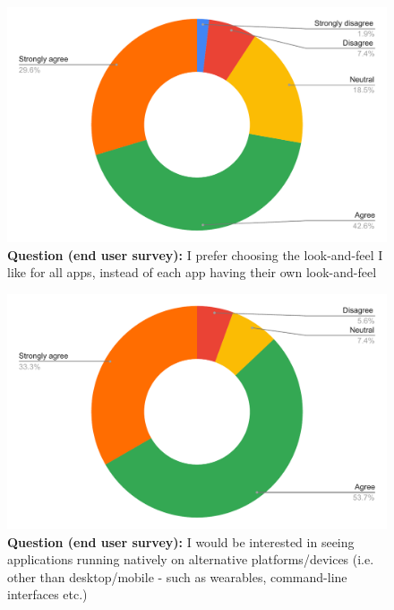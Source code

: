 \begin{figure}[H]
  \centering
  \includegraphics[width=13cm]{thesis/paper/images/p2u_q8.pdf}
  \textbf{Question (end user survey):} I prefer choosing the look-and-feel I like for all apps, instead of each app having their own look-and-feel
\end{figure}

\begin{figure}[H]
  \centering
  \includegraphics[width=13cm]{thesis/paper/images/p2u_q9.pdf}
  \textbf{Question (end user survey):} I would be interested in seeing applications running natively on alternative platforms/devices (i.e. other than desktop/mobile - such as wearables, command-line interfaces etc.)
\end{figure}

